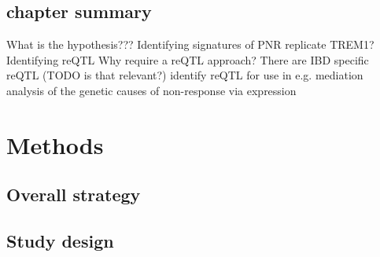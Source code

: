 \begin{outline}
\subsection{chapter summary}

\1 What is the hypothesis???
\1 Identifying signatures of PNR
    \2 replicate TREM1?
\1 Identifying reQTL
    \2 Why require a reQTL approach?
    \2 There are IBD specific reQTL (TODO is that relevant?) \autocite{piasecka2018DistinctiveRolesAge}
    \2 identify reQTL for use in e.g. mediation analysis of the genetic causes of non-response via expression

\section{Methods}

\subsection{Overall strategy}


\subsection{Study design}


\end{outline}
